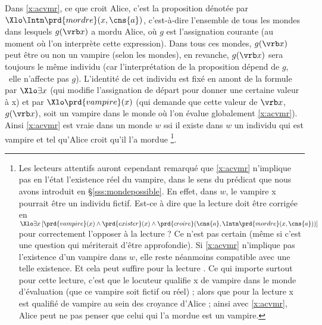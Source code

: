 Dans \ref{x:acvmr}, ce que croit Alice, c'est la proposition dénotée par \(\Xlo\Intn\prd{mordre}(x,\cns{a})\), c'est-à-dire l'ensemble de tous les mondes dans lesquels $g(\vrb x)$ a mordu Alice, où $g$ est l'assignation courante (au moment où l'on interprète cette expression).  Dans tous ces mondes, $g(\vrb x)$ peut être ou non un vampire (selon les mondes), en revanche, $g(\vrb x)$ sera toujours le même individu (car l'interprétation de la proposition dépend de $g$, \ie\ elle n'affecte pas $g$). 
L'identité de cet individu est fixé en amont de la formule par $\Xlo\exists x$ (qui modifie l'assignation de départ pour donner une certaine valeur à \vrb x)
et par $\Xlo\prd{vampire}(x)$ (qui demande que cette valeur de $\vrb x$, $g(\vrb x)$, soit un vampire dans le monde où l'on évalue globalement \ref{x:acvmr}).
Ainsi \ref{x:acvmr} est vraie dans un monde $w$ ssi il existe dans $w$ un individu qui est vampire et tel qu'Alice croit qu'il l'a mordue%
\footnote{\label{fn:dere-exister}Les lecteurs attentifs auront cependant remarqué que \ref{x:acvmr} n'implique pas en l'état l'existence réel du vampire, dans le sens du prédicat  que nous avons introduit en \S\ref{sss:mondepossible}. En effet, dans $w$, le vampire \vrb x pourrait être un individu fictif. Est-ce à dire que la lecture  doit être corrigée en \(\Xlo\exists x\,[\prd{vampire}(x) \wedge \prd{exister}(x) \wedge \prd{croire}(\cns{a}, \Intn\prd{mordre}(x,\cns{a}))]\) pour correctement l'opposer à la lecture  ? Ce n'est pas certain (même si c'est une question qui mériterait d'être approfondie). Si \ref{x:acvmr} n'implique pas l'existence d'un vampire dans $w$, elle reste néanmoins compatible avec une telle existence. Et cela peut suffire pour la lecture . Ce qui importe surtout pour cette lecture, c'est que le locuteur qualifie \vrb x de vampire dans le monde d'évaluation (que ce vampire soit fictif ou réel) ; alors que pour la lecture  \vrb x est qualifié de vampire au sein des croyance d'Alice ; ainsi avec \ref{x:acvmr}, Alice peut ne pas penser que celui qui l'a mordue est un vampire.}.

